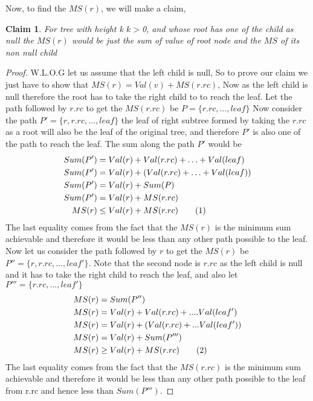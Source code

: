 \documentclass[answers]{exam}
\newcommand\numberthis{\addtocounter{equation}{1}\tag{\theequation}}
\newtheorem{claim}{Claim}
\begin{document}
\begin{questions}
\begin{solution}
Now, to find the $MS(r)$, we will make a claim,
\begin{claim}
For tree with height k $k>$0, and whose root has one of the child as null the $MS(r)$ would be just the sum of value of root node and the $MS$ of its non null child
\end{claim}
\begin{proof}
W.L.O.G let us assume that the left child is null, So to prove our claim we just have to show that $MS(r)= Val(v)+MS(r.rc)$,
\newline Now as the left child is null therefore the root has to take the right child to to reach the leaf.
\newline Let the path followed by $r.rc$ to get the $MS(r.rc)$ be $P=\{r.rc, \ldots, leaf\}$ Now consider the path $P'=\{r,r.rc,\ldots,leaf\}$ the leaf of right subtree formed by taking the $r.rc$ as a root will also be the leaf of the original tree, and therefore $P'$ is also one of the path to reach the leaf. The sum along the path $P'$ would be 
\begin{align*}
    Sum(P')&=Val(r)+Val(r.rc)+\ldots+Val(leaf)\\
    Sum(P')&=Val(r)+(Val(r.rc)+\ldots+Val(leaf))\\
    Sum(P')&=Val(r)+Sum(P)\\
    Sum(P')&=Val(r)+MS(r.rc) \\
    MS(r)&\leq Val(r)+MS(r.rc) \numberthis \label{eqn}
\end{align*}
The last equality comes from the fact that the $MS(r)$ is the minimum sum achievable and therefore it would be less than any other path possible to the leaf.
\newline Now let us consider  the path followed by $r$ to get the $MS(r)$ be $P''=\{r,r.rc,\ldots,leaf'\}$. Note that the second node is $r.rc$ as the left child is null and it has to take the right child to reach the leaf, and also let $P'''=\{r.rc,\ldots,leaf'\}$
\begin{align*}
    MS(r)&=Sum(P'')\\
    MS(r)&=Val(r)+Val(r.rc)+....Val(leaf')\\
    MS(r)&=Val(r)+(Val(r.rc)+...Val(leaf'))\\
    MS(r)&=Val(r)+Sum(P''')\\
    MS(r)&\geq Val(r)+MS(r.rc) \numberthis \label{eqn}
\end{align*}
The last equality comes from the  fact that the $MS(r.rc)$ is the minimum sum achievable and therefore it would be less than any other path possible to the leaf from r.rc and hence less than $Sum(P''')$. 

\end{proof}
\end{solution}
\end{questions}
\end{document}

